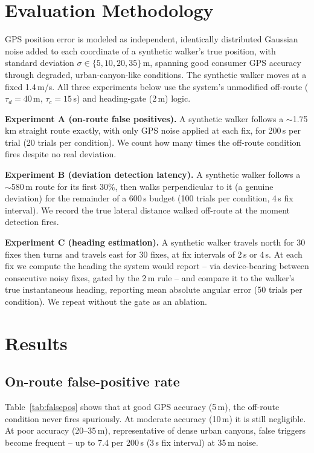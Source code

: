 \documentclass[conference]{IEEEtran}
\begin{document}
\section{Evaluation Methodology}
\label{sec:method}

GPS position error is modeled as independent, identically distributed Gaussian noise added to each coordinate of a synthetic walker's true position, with standard deviation $\sigma \in \{5, 10, 20, 35\}$\,m, spanning good consumer GPS accuracy through degraded, urban-canyon-like conditions. The synthetic walker moves at a fixed 1.4\,m/s. All three experiments below use the system's unmodified off-route ($\tau_d{=}40$\,m, $\tau_c{=}15$\,s) and heading-gate (2\,m) logic.

\textbf{Experiment A (on-route false positives).} A synthetic walker follows a $\sim$1.75\,km straight route exactly, with only GPS noise applied at each fix, for 200\,s per trial (20 trials per condition). We count how many times the off-route condition fires despite no real deviation.

\textbf{Experiment B (deviation detection latency).} A synthetic walker follows a $\sim$580\,m route for its first 30\%, then walks perpendicular to it (a genuine deviation) for the remainder of a 600\,s budget (100 trials per condition, 4\,s fix interval). We record the true lateral distance walked off-route at the moment detection fires.

\textbf{Experiment C (heading estimation).} A synthetic walker travels north for 30 fixes then turns and travels east for 30 fixes, at fix intervals of 2\,s or 4\,s. At each fix we compute the heading the system would report -- via device-bearing between consecutive noisy fixes, gated by the 2\,m rule -- and compare it to the walker's true instantaneous heading, reporting mean absolute angular error (50 trials per condition). We repeat without the gate as an ablation.

\section{Results}
\label{sec:results}

\subsection{On-route false-positive rate}
Table~\ref{tab:falsepos} shows that at good GPS accuracy (5\,m), the off-route condition never fires spuriously. At moderate accuracy (10\,m) it is still negligible. At poor accuracy (20--35\,m), representative of dense urban canyons, false triggers become frequent -- up to 7.4 per 200\,s (3\,s fix interval) at 35\,m noise.
\end{document}
